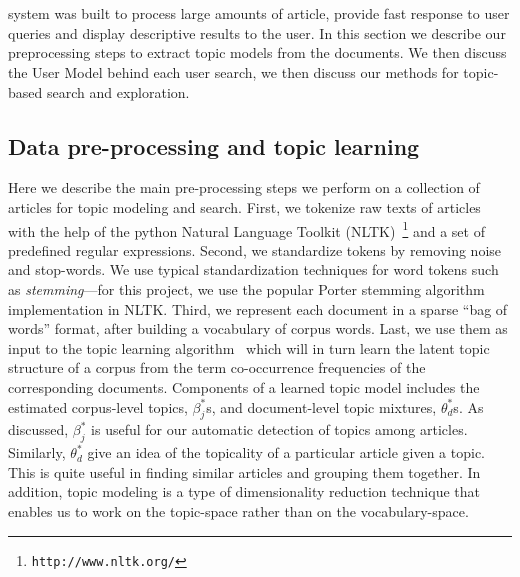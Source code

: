\section{\system}


{\system} system was built to process large amounts of article,
provide fast response to user queries and display descriptive
results to the user.
In this section we describe our preprocessing steps to extract
topic models from the documents.
We then discuss the User Model behind each user search, we then
discuss our methods for topic-based search and exploration.



\subsection{Data pre-processing and topic learning}

Here we describe the main pre-processing steps we perform on a 
collection of articles for topic modeling and search. First, 
we tokenize raw texts of articles with the help of the python 
Natural Language Toolkit (NLTK)~\footnote{\texttt{http://www.nltk.org/}} and a set of 
predefined regular expressions. Second, we standardize tokens by 
removing noise and stop-words. We use typical standardization 
techniques for word tokens such as \textsl{stemming}---for this 
project, we use the popular Porter stemming algorithm~\cite{Porter1980} 
implementation in NLTK\@. Third, we represent each 
document in a sparse ``bag of words'' format, after building a 
vocabulary of corpus words. Last, we use them as input to the topic 
learning algorithm~\cite{hoffman2010online} which will in turn learn 
the latent topic structure of a corpus from the term co-occurrence 
frequencies of the corresponding documents. Components of a learned 
topic model includes the estimated corpus-level topics, $\beta_j^{*}$s, 
and document-level topic mixtures, $\theta_d^{*}$s. As discussed, 
$\beta_j^{*}$ is useful for our automatic detection of topics among  
articles. Similarly, $\theta_d^{*}$ give an idea of the topicality 
of a particular article given a topic. This is quite useful in 
finding similar articles and grouping them together. In addition, 
topic modeling is a type of dimensionality reduction technique that 
enables us to work on the topic-space rather than on the 
vocabulary-space.



